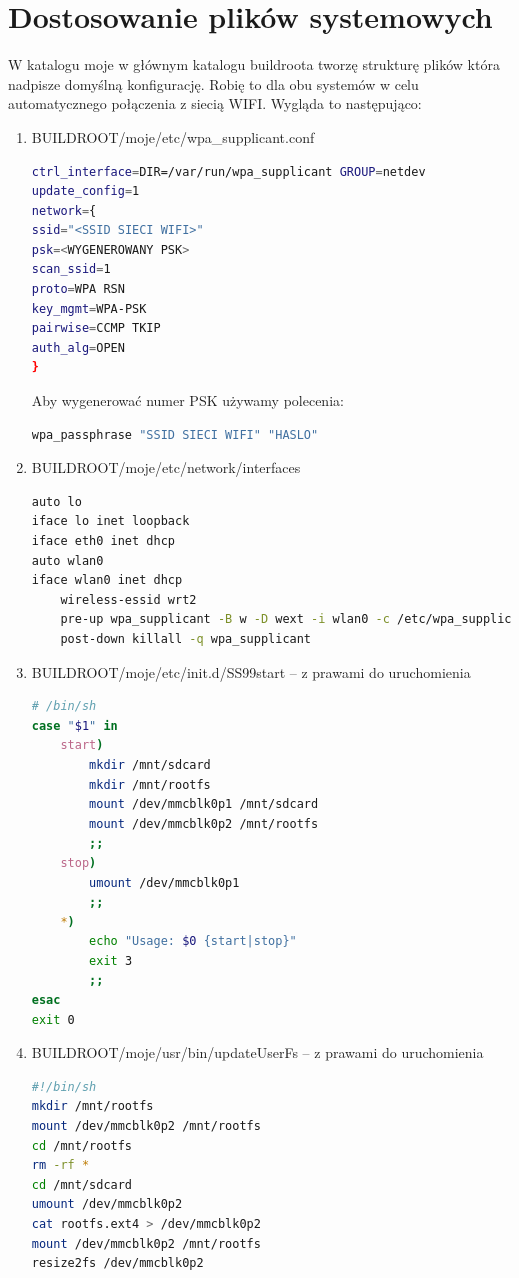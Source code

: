 \section{Dostosowanie plików systemowych}
W katalogu moje w głównym katalogu buildroota tworzę strukturę plików która nadpisze domyślną konfigurację.
Robię to dla obu systemów w celu automatycznego połączenia z siecią WIFI. Wygląda to następująco:
\begin{enumerate}
\item BUILDROOT/moje/etc/wpa\_supplicant.conf
\begin{lstlisting}[language=bash]
ctrl_interface=DIR=/var/run/wpa_supplicant GROUP=netdev
update_config=1
network={
ssid="<SSID SIECI WIFI>"
psk=<WYGENEROWANY PSK>
scan_ssid=1
proto=WPA RSN
key_mgmt=WPA-PSK
pairwise=CCMP TKIP
auth_alg=OPEN
}
\end{lstlisting}	
Aby wygenerować numer PSK używamy polecenia:
\begin{lstlisting}[language=bash]
wpa_passphrase "SSID SIECI WIFI" "HASLO"
\end{lstlisting}
\item BUILDROOT/moje/etc/network/interfaces
\begin{lstlisting}[language=bash]
auto lo
iface lo inet loopback
iface eth0 inet dhcp
auto wlan0
iface wlan0 inet dhcp
    wireless-essid wrt2
    pre-up wpa_supplicant -B w -D wext -i wlan0 -c /etc/wpa_supplicant.conf -dd
    post-down killall -q wpa_supplicant
\end{lstlisting}
\item BUILDROOT/moje/etc/init.d/SS99start -- z prawami do uruchomienia
\begin{lstlisting}[language=bash]
# /bin/sh
case "$1" in
	start)
		mkdir /mnt/sdcard
		mkdir /mnt/rootfs
		mount /dev/mmcblk0p1 /mnt/sdcard
		mount /dev/mmcblk0p2 /mnt/rootfs 
		;;
	stop)
		umount /dev/mmcblk0p1
		;;
	*)
		echo "Usage: $0 {start|stop}"
		exit 3 
		;;
esac
exit 0
\end{lstlisting}
\item BUILDROOT/moje/usr/bin/updateUserFs -- z prawami do uruchomienia
\begin{lstlisting}[language=bash]
#!/bin/sh
mkdir /mnt/rootfs
mount /dev/mmcblk0p2 /mnt/rootfs
cd /mnt/rootfs
rm -rf *
cd /mnt/sdcard
umount /dev/mmcblk0p2
cat rootfs.ext4 > /dev/mmcblk0p2
mount /dev/mmcblk0p2 /mnt/rootfs
resize2fs /dev/mmcblk0p2
\end{lstlisting}
\end{enumerate}


